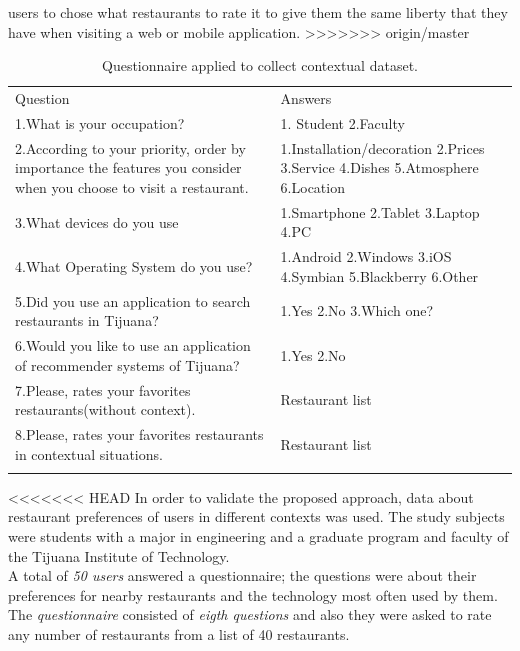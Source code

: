 users to chose what restaurants to rate it to give them the same liberty
that they have when visiting a web or mobile application. 
>>>>>>> origin/master
\begin{table}
\small
\captionsetup{font=footnotesize}
\caption{Questionnaire applied to collect contextual dataset.}
\label{tab:questions} 
\centering
\small
\begin{tabular}{p{7cm} p{5cm} }
\hline\noalign{\smallskip}
Question & Answers \\
\noalign{\smallskip}\hline\noalign{\smallskip}
\small{1.What is your occupation?} & \small{1. Student 2.Faculty} \\ \hline  
\small{2.According to your priority, order by importance the features 
you consider when you choose to visit a restaurant.} & 
\small{1.Installation/decoration 2.Prices 3.Service 4.Dishes
5.Atmosphere 6.Location} \\ \hline  
\small{3.What devices do you use} &
\small{1.Smartphone 2.Tablet 3.Laptop 4.PC} \\ \hline   
\small{4.What Operating System do you use?} & 
\small{1.Android 2.Windows 3.iOS 4.Symbian 5.Blackberry 6.Other}
\\ \hline  
\small{5.Did you use an application to search restaurants in Tijuana?} &
\small{1.Yes 2.No 3.Which one?} \\ \hline   
\small{6.Would you like to use an application of
recommender systems of Tijuana?} & \small{1.Yes 2.No} \\ \hline  
\small{7.Please, rates your favorites restaurants(without context).} & 
\small{Restaurant list} \\ \hline
\small{8.Please, rates your favorites restaurants in contextual situations.} & 
\small{Restaurant list} \\
\noalign{\smallskip}\hline
\end{tabular}
\end{table}
<<<<<<< HEAD
In order to validate the proposed approach,  data  about 
restaurant preferences of users in different contexts was used.
The study subjects were students  with a major in engineering and  
a graduate program and faculty of the Tijuana Institute of
Technology.\\ A total of \textit{50 users} answered a questionnaire; the
questions were about their preferences for nearby restaurants and the
technology most often used by them. The \textit{questionnaire} consisted 
of \textit{eigth questions} and also they were asked to rate any number 
of restaurants from a list of 40 restaurants.
